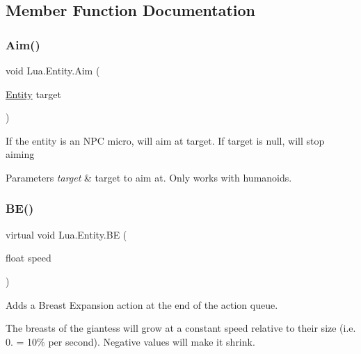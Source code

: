 \subsection{Member Function Documentation}
\mbox{\label{class_lua_1_1_entity_ac47475b1b0342f1e6ce52aca2eec7f38}} 
\subsubsection{\texorpdfstring{Aim()}{Aim()}}
{\footnotesize\ttfamily void Lua.\+Entity.\+Aim (\begin{DoxyParamCaption}\item[{\mbox{\hyperlink{class_lua_1_1_entity}{Entity}}}]{target }\end{DoxyParamCaption})}



If the entity is an N\+PC micro, will aim at target. If target is null, will stop aiming 


\begin{DoxyParams}{Parameters}
{\em target} & target to aim at. Only works with humanoids.\\
\hline
\end{DoxyParams}
\mbox{\label{class_lua_1_1_entity_a1bf50f8db78480e10f40a71e44480e21}} 
\subsubsection{\texorpdfstring{BE()}{BE()}\hspace{0.1cm}{\footnotesize\ttfamily [1/2]}}
{\footnotesize\ttfamily virtual void Lua.\+Entity.\+BE (\begin{DoxyParamCaption}\item[{float}]{speed }\end{DoxyParamCaption})\hspace{0.3cm}{\ttfamily [virtual]}}



Adds a Breast Expansion action at the end of the action queue. 

The breasts of the giantess will grow at a constant speed relative to their size (i.\+e. 0. = 10\% per second). Negative values will make it shrink. \mbox{\label{class_lua_1_1_entity_ac8dfc303d378e4e805c5ba3f38f49c59}} 
